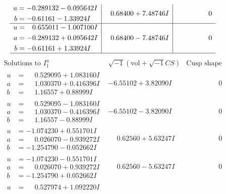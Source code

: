 \documentclass[1p]{elsarticle_modified}
\theoremstyle{definition}
\newcommand{\I}{\sqrt{-1}}
\begin{document}
$$\begin{array}{c|c|c}
\begin{aligned}
a &= -0.289132 - 0.095642 I \\
b &= -0.61161 - 1.33924 I\end{aligned}
 & \phantom{-}0.68400 + 7.48746 I & \phantom{-0.000000 } 0 \\ \hline\begin{aligned}
u &= \phantom{-}0.655011 - 1.007100 I \\
a &= -0.289132 + 0.095642 I \\
b &= -0.61161 + 1.33924 I\end{aligned}
 & \phantom{-}0.68400 - 7.48746 I & \phantom{-0.000000 } 0\\
 \hline 
 \end{array}$$\newpage$$\begin{array}{c|c|c}  
\text{Solutions to }I^u_{1}& \I (\text{vol} + \sqrt{-1}CS) & \text{Cusp shape}\\
 \hline 
\begin{aligned}
u &= \phantom{-}0.529095 + 1.083160 I \\
a &= \phantom{-}1.030370 + 0.416396 I \\
b &= \phantom{-}1.16557 + 0.88999 I\end{aligned}
 & -6.55102 + 3.82090 I & \phantom{-0.000000 } 0 \\ \hline\begin{aligned}
u &= \phantom{-}0.529095 - 1.083160 I \\
a &= \phantom{-}1.030370 - 0.416396 I \\
b &= \phantom{-}1.16557 - 0.88999 I\end{aligned}
 & -6.55102 - 3.82090 I & \phantom{-0.000000 } 0 \\ \hline\begin{aligned}
u &= -1.074230 + 0.551701 I \\
a &= \phantom{-}0.026070 - 0.939272 I \\
b &= -1.254790 - 0.052662 I\end{aligned}
 & \phantom{-}0.62560 + 5.63247 I & \phantom{-0.000000 } 0 \\ \hline\begin{aligned}
u &= -1.074230 - 0.551701 I \\
a &= \phantom{-}0.026070 + 0.939272 I \\
b &= -1.254790 + 0.052662 I\end{aligned}
 & \phantom{-}0.62560 - 5.63247 I & \phantom{-0.000000 } 0 \\ \hline\begin{aligned}
u &= \phantom{-}0.527974 + 1.092220 I \\

\end{aligned}
\end{array}$$
\end{document}
